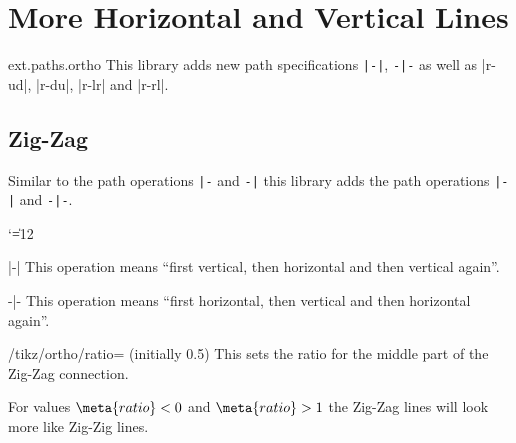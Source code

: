 %
%
%

\section{More Horizontal and Vertical Lines}
\label{library:paths.ortho}

\begin{tikzlibrary}{ext.paths.ortho}
  This library adds new path specifications \verb!|-|!, \verb!-|-! as well as
  |r-ud|, |r-du|, |r-lr| and |r-rl|.
\end{tikzlibrary}

\subsection{Zig-Zag}
Similar to the path operations \verb!|-! and \verb!-|! this library adds\indexPathOperationO{\protect\pgfmanualbar-}\indexPathOperationO{-\protect\pgfmanualbar}
the path operations \verb!|-|! and \verb!-|-!.
{\catcode`\|=12
\begin{pathoperation}[noindex]{|-|}{}
    \pgfmanualpdflabel[\catcode`\|=12 ]{|-|}{}%
    This operation means ``first vertical, then horizontal and then vertical again''.
\end{pathoperation}
\begin{pathoperation}[noindex]{-|-}{}
    \pgfmanualpdflabel[\catcode`\|=12 ]{-|-}{}%
    This operation means ``first horizontal, then vertical and then horizontal again''.
\end{pathoperation}
}
\begin{key}{/tikz/ortho/ratio= (initially 0.5)}
  This sets the ratio for the middle part of the Zig-Zag connection.
  
  For values $\meta{ratio} < 0$ and $\meta{ratio} > 1$ the Zig-Zag lines will
  look more like Zig-Zig lines.
\begin{codeexample}[preamble=\usetikzlibrary{ext.paths.ortho}]
\end{codeexample}
\end{key}
